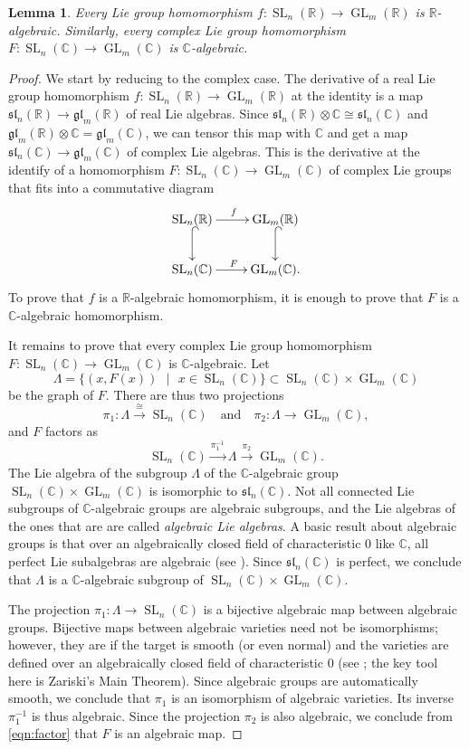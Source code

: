\documentclass[11pt]{article}
\numberwithin{equation}{section}
\theoremstyle{plain}
\newtheorem{lemma}[theorem]{Lemma}
\theoremstyle{definition}
\theoremstyle{remark}
\DeclareMathOperator{\GL}{GL}
\DeclareMathOperator{\SL}{SL}
\newcommand\fsl{\ensuremath{\mathfrak{sl}}}
\newcommand\fgl{\ensuremath{\mathfrak{gl}}}
\newcommand\R{\ensuremath{\mathbb{R}}}
\newcommand\C{\ensuremath{\mathbb{C}}}
\newcommand\Set[2]{\ensuremath{\{\text{#1 $|$ #2}\}}}
\begin{document}
\begin{lemma}
\label{lemma:continuousrational}
Every Lie group homomorphism $f\colon \SL_n(\R) \rightarrow \GL_m(\R)$ is
$\R$-algebraic.  Similarly, every complex Lie group homomorphism
$F\colon \SL_n(\C) \rightarrow \GL_m(\C)$ is $\C$-algebraic.
\end{lemma}
\begin{proof}
We start by reducing to the complex case.  The derivative of a real Lie group
homomorphism $f\colon \SL_n(\R) \rightarrow \GL_m(\R)$ at the identity is a map 
$\fsl_n(\R) \rightarrow \fgl_m(\R)$ of real Lie algebras.
Since $\fsl_n(\R) \otimes \C \cong \fsl_n(\C)$ and $\fgl_m(\R) \otimes \C = \fgl_m(\C)$, we can tensor
this map with $\C$ and get a map $\fsl_n(\C) \rightarrow \fgl_m(\C)$ of complex Lie algebras.  This is the derivative
at the identify of a homomorphism $F\colon \SL_n(\C) \rightarrow \GL_m(\C)$ of complex Lie groups that fits
into a commutative diagram
\[\xymatrix{
\SL_n(\R) \ar[r]^{f} \ar@{^{(}->}[d] & \GL_m(\R) \ar@{^{(}->}[d] \\
\SL_n(\C) \ar[r]^{F} & \GL_m(\C).}\]
To prove that $f$ is a $\R$-algebraic homomorphism, it is enough to prove that $F$ is a $\C$-algebraic homomorphism.

It remains to prove that every complex Lie group homomorphism $F\colon \SL_n(\C) \rightarrow \GL_m(\C)$ is $\C$-algebraic.  Let
\[\Lambda = \Set{$(x,F(x))$}{$x \in \SL_n(\C)$} \subset \SL_n(\C) \times \GL_m(\C)\]
be the graph of $F$.  There are thus two projections
\[\pi_1\colon \Lambda \stackrel{\cong}{\longrightarrow} \SL_n(\C) \quad \text{and} \quad \pi_2\colon \Lambda \longrightarrow \GL_m(\C),\]
and $F$ factors as
\begin{equation}
\label{eqn:factor}
\SL_n(\C) \stackrel{\pi_1^{-1}}{\longrightarrow} \Lambda \stackrel{\pi_2}{\longrightarrow} \GL_m(\C).
\end{equation}
The Lie algebra of the subgroup $\Lambda$ of the $\C$-algebraic group $\SL_n(\C) \times \GL_m(\C)$ is isomorphic
to $\fsl_n(\C)$.  Not all connected Lie subgroups of $\C$-algebraic groups are
algebraic subgroups, and the Lie algebras of the ones that are are called
{\em algebraic Lie algebras}.
A basic result about algebraic groups is that over an algebraically closed field
of characteristic $0$ like $\C$,
all perfect Lie subalgebras are algebraic (see
\cite[Corollary 7.9]{BorelBook}).  Since $\fsl_n(\C)$ is perfect, we conclude that
$\Lambda$ is a $\C$-algebraic subgroup of $\SL_n(\C) \times \GL_m(\C)$.

The projection
$\pi_1\colon \Lambda \rightarrow \SL_n(\C)$ is a bijective algebraic map between algebraic groups.  Bijective
maps between algebraic varieties need not be isomorphisms; however, they are if the target is smooth (or even normal)
and the varieties are defined over an algebraically closed field of characteristic $0$ (see
\cite{StarrMathOverflow}; the key tool here is Zariski's Main Theorem).  Since algebraic groups
are automatically smooth, we conclude that $\pi_1$ is an isomorphism of algebraic varieties.  Its inverse $\pi_1^{-1}$
is thus algebraic.  Since the projection $\pi_2$ is also algebraic, we conclude from \eqref{eqn:factor} that
$F$ is an algebraic map.
\end{proof}
\end{document}
